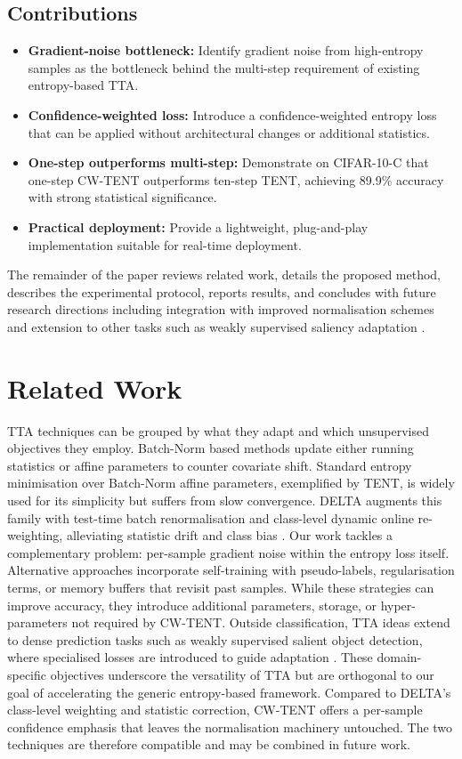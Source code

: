 \documentclass{article} %
\begin{document}
\subsection{Contributions}
\begin{itemize}
  \item \textbf{Gradient-noise bottleneck:} Identify gradient noise from high-entropy samples as the bottleneck behind the multi-step requirement of existing entropy-based TTA.
  \item \textbf{Confidence-weighted loss:} Introduce a confidence-weighted entropy loss that can be applied without architectural changes or additional statistics.
  \item \textbf{One-step outperforms multi-step:} Demonstrate on CIFAR-10-C that one-step CW-TENT outperforms ten-step TENT, achieving 89.9\% accuracy with strong statistical significance.
  \item \textbf{Practical deployment:} Provide a lightweight, plug-and-play implementation suitable for real-time deployment.
\end{itemize}
The remainder of the paper reviews related work, details the proposed method, describes the experimental protocol, reports results, and concludes with future research directions including integration with improved normalisation schemes \cite{zhao-2023-delta} and extension to other tasks such as weakly supervised saliency adaptation \cite{author-year-test}.

\section{Related Work}
\label{sec:related}
TTA techniques can be grouped by what they adapt and which unsupervised objectives they employ. Batch-Norm based methods update either running statistics or affine parameters to counter covariate shift. Standard entropy minimisation over Batch-Norm affine parameters, exemplified by TENT, is widely used for its simplicity but suffers from slow convergence. DELTA augments this family with test-time batch renormalisation and class-level dynamic online re-weighting, alleviating statistic drift and class bias \cite{zhao-2023-delta}. Our work tackles a complementary problem: per-sample gradient noise within the entropy loss itself.
Alternative approaches incorporate self-training with pseudo-labels, regularisation terms, or memory buffers that revisit past samples. While these strategies can improve accuracy, they introduce additional parameters, storage, or hyper-parameters not required by CW-TENT.
Outside classification, TTA ideas extend to dense prediction tasks such as weakly supervised salient object detection, where specialised losses are introduced to guide adaptation \cite{author-year-test}. These domain-specific objectives underscore the versatility of TTA but are orthogonal to our goal of accelerating the generic entropy-based framework.
Compared to DELTA's class-level weighting and statistic correction, CW-TENT offers a per-sample confidence emphasis that leaves the normalisation machinery untouched. The two techniques are therefore compatible and may be combined in future work.
\end{document}
